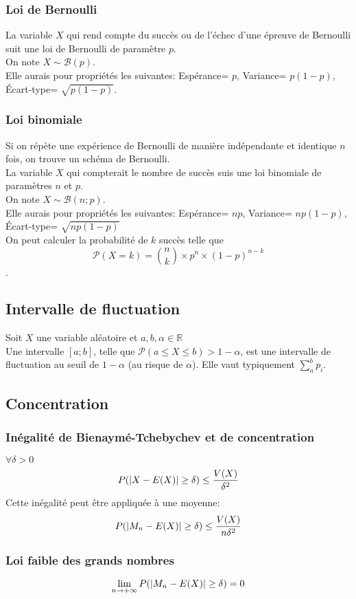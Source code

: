\documentclass{article}
\begin{document}
\subsubsection{Loi de Bernoulli}
La variable $X$ qui rend compte du succès ou de l'échec d'une épreuve de Bernoulli suit une loi de Bernoulli de paramètre $p$. \\
On note $X \sim \mathcal{B}(p)$. \\
Elle aurais pour propriétés les suivantes: Espérance= $p$, Variance= $p(1-p)$, Écart-type= $\sqrt{p(1-p)}$.
\subsubsection{Loi binomiale}
Si on répète une expérience de Bernoulli de manière indépendante et identique $n$ fois, on trouve un schéma de Bernoulli.\\
La variable $X$ qui compterait le nombre de succès suis une loi binomiale de paramètres $n$ et $p$. \\
On note $X \sim \mathcal{B}(n;p)$. \\
Elle aurais pour propriétés les suivantes: Espérance= $np$, Variance= $np(1-p)$, Écart-type= $\sqrt{np(1-p)}$\\
On peut calculer la probabilité de $k$ succès telle que $$\mathcal{P}(X=k)= \binom{n}{k}\times p^n\times (1-p)^{n-k}$$.
\subsection{Intervalle de fluctuation}
Soit $X$ une variable aléatoire et $a,b,\alpha \in \mathbb{R}$ \\
Une intervalle $[a;b]$, telle que $\mathcal{P}(a\le X \le b) > 1-\alpha$, est une intervalle de fluctuation au seuil de $1-\alpha$ (au risque de $\alpha$). Elle vaut typiquement $\sum_a^b p_i$.


\pagebreak\pagebreak
\subsection{Concentration}
\subsubsection{Inégalité de Bienaymé-Tchebychev et de concentration}
$\forall \delta > 0$
$$P(\abs{X - E(X)} \ge \delta) \le \frac{V(X)}{\delta^2}$$
Cette inégalité peut être appliquée à une moyenne:
$$P(\abs{M_n - E(X)} \ge \delta) \le \frac{V(X)}{n\delta^2}$$
\subsubsection{Loi faible des grands nombres}
$$\lim \limits_{n \rightarrow +\infty} P(\abs{M_n - E(X)} \ge \delta) = 0$$
\end{document}
